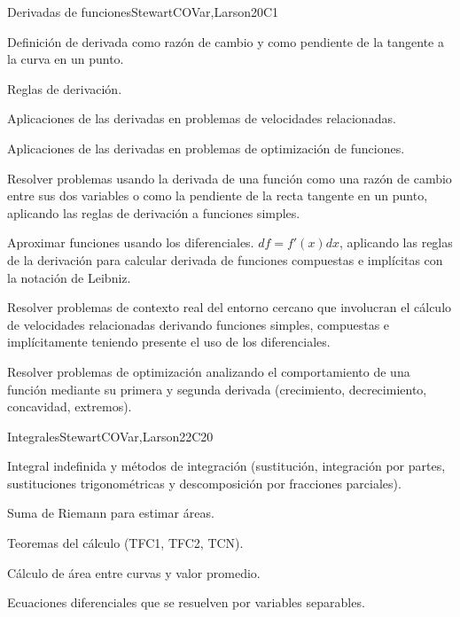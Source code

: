 \begin{syllabus}
\begin{unit}{Derivadas de funciones}{}{StewartCOVar,Larson}{20}{C1}
   \begin{topics}
      \item Definición de derivada como razón de cambio y como pendiente de la tangente a la curva en un punto.
      \item Reglas de derivación.
      \item Aplicaciones de las derivadas en problemas de velocidades relacionadas.
      \item Aplicaciones de las derivadas en problemas de optimización de funciones.
   \end{topics}

   \begin{learningoutcomes}
      \item Resolver problemas usando la derivada de una función como una razón de cambio entre sus dos variables o como la pendiente de la recta tangente en un punto, aplicando las reglas de derivación a funciones simples. 
      \item Aproximar funciones usando los diferenciales. $df=f'(x)dx$, aplicando las reglas de la derivación para calcular derivada de funciones compuestas e implícitas con la notación de Leibniz.
      \item Resolver problemas de contexto real del entorno cercano que involucran el cálculo de velocidades relacionadas derivando funciones simples, compuestas e implícitamente teniendo presente el uso de los diferenciales.
      \item Resolver problemas de optimización analizando el comportamiento de una función mediante su primera y segunda derivada (crecimiento, decrecimiento, concavidad, extremos).
   \end{learningoutcomes}
\end{unit}

\begin{unit}{Integrales}{}{StewartCOVar,Larson}{22}{C20}
   \begin{topics}
      \item Integral indefinida y métodos de integración (sustitución, integración por partes, sustituciones trigonométricas y descomposición por fracciones parciales).
      \item Suma de Riemann para estimar áreas.
      \item Teoremas del cálculo (TFC1, TFC2, TCN).
      \item Cálculo de área entre curvas y valor promedio.
      \item Ecuaciones diferenciales que se resuelven por variables separables.
   \end{topics}


\end{unit}
\end{syllabus}
